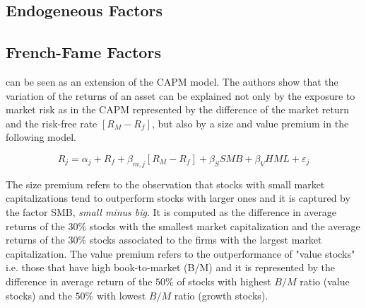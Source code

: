 \documentclass[hidelinks,12pts]{article}
\DeclareMathOperator{\1}{\mathbbm{1}}
\begin{document}
    \subsection{Endogeneous Factors}





    \subsection{French-Fame Factors}

\cite{famaCommonRiskFactors1993} can be seen as an extension of the CAPM model. 
The authors show that the variation of the returns of an asset can be explained not only by the exposure to market risk as in the CAPM represented by the difference of the market return and the risk-free rate $[R_M-R_f]$, but also by a size and value premium in the following model.
    
    \begin{equation}
        R_j = \alpha_j + R_f + \beta_{m,j}[R_M-R_f] +\beta_{S} SMB + \beta_{V}HML +\varepsilon_j
    \end{equation}

The size premium refers to the observation that stocks with small market capitalizations tend to outperform stocks with larger ones and it is captured by the factor SMB, \emph{small minus big}.
It is computed as the difference in average returns of the $30\%$ stocks with the smallest market capitalization and the average returns of the $30\%$ stocks associated to the firms with the largest market capitalization. 
The value premium refers to the outperformance of "value stocks" i.e. those that have high book-to-market (B/M) and it is represented by the difference in average return of the $50\%$ of stocks with highest $B/M$ ratio (value stocks) and the $50\%$ with lowest $B/M$ ratio (growth stocks). 
\end{document}
